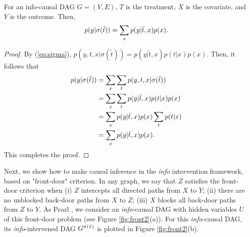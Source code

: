  \begin{Thm}
 	For an info-causal DAG $G=(V,E)$, $T$ is the treatment, $X$ is the covariate, and $Y$ is the outcome. Then,
 	$$
 	p(y|\mathrm{\sigma}(\tilde{t})) = \sum_x p(y|\tilde{t}, x) p(x).
	$$
 \end{Thm}
\begin{proof}
	By (\ref{eq:sigma}), 
 	$p(y, t, x|\sigma(\tilde{t})) = p(y|\tilde{t}, x) p(t|x) p(x)$. 
 	Then, it follows that
 	\begin{align*}
 		p(y|\mathrm{\sigma}(\tilde{t})) &= \sum_x \sum_t p(y, t, x|\sigma(\tilde{t})) \\
 		&= \sum_x \sum_t p(y|\tilde{t}, x) p(t|x) p(x) \\
 		&= \sum_x p(y|\tilde{t}, x) p(x) \sum_t p(t|x) \\
 		&= \sum_x p(y|\tilde{t}, x) p(x).
 	\end{align*}
 	This completes the proof. 
\end{proof}


Next, we show how to make causal inference in the \emph{info} intervention framework, based on 
"front-door" criterion. In any graph, we say that $Z$ satisfies the front-door criterion when (i) $Z$ intercepts all directed paths from $X$ to $Y$; (ii) there are no unblocked back-door paths from $X$ to $Z$; (iii) $X$ blocks all back-door paths from $Z$ to $Y$. 
As Pearl \cite{Pearl2009}, we consider an \emph{info}-causal DAG 
with hidden variables $U$ of this front-door problem (see 
Figure \ref{fig:front2}(a)).
For this  \emph{info}-causal DAG, its 
\emph{info}-intervened DAG $G^{\mathrm{\sigma}(\tilde{x})}$ is plotted in Figure \ref{fig:front2}(b).

